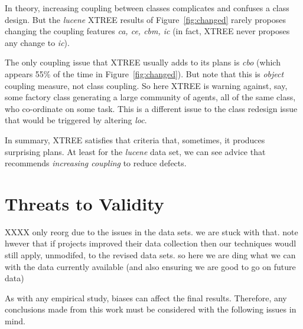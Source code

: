 \documentclass{sig-alternate}
\newcommand{\fig}[1]{Figure~\ref{fig:#1}}
\begin{document}
{\begin{itemize}[leftmargin=3mm]
In theory, increasing coupling between classes complicates and confuses a class design.
But the {\em lucene} XTREE results  of  \fig{changed} rarely proposes changing   the
coupling features {\em ca, ce, cbm, ic} (in fact, XTREE never proposes any change to {\em ic}).

The only coupling issue that XTREE   usually adds to its plans is {\em cbo} (which appears 55\% of the time
in \fig{changed}). But note  that this is {\em object} coupling measure, not class coupling. So here
XTREE is warning against, say, some factory class generating a large
community of agents, all of the same class, who
co-ordinate on some task. This is a different issue to the class redesign issue that would
be triggered by altering {\em loc}.

In summary, XTREE satisfies that criteria that, sometimes, it produces surprising plans.
At least for the {\em lucene} data set, we can see advice that recommends {\em increasing coupling}
to reduce defects.

 


 
\section{Threats to Validity}\label{sect:valid}

XXXX only reorg due to the issues in the data sets.
we are stuck with that. note hwever that if
projects improved their data collection then
our techniques woudl still apply, unmodifed, to the revised data sets. so here we are ding what we can with the data currently available (and also ensuring we are good to go on future data)


As with any empirical study, biases can affect the final results. Therefore, any
conclusions made from this work must be considered with the following issues in
mind.

 

\end{itemize}}
\end{document}
